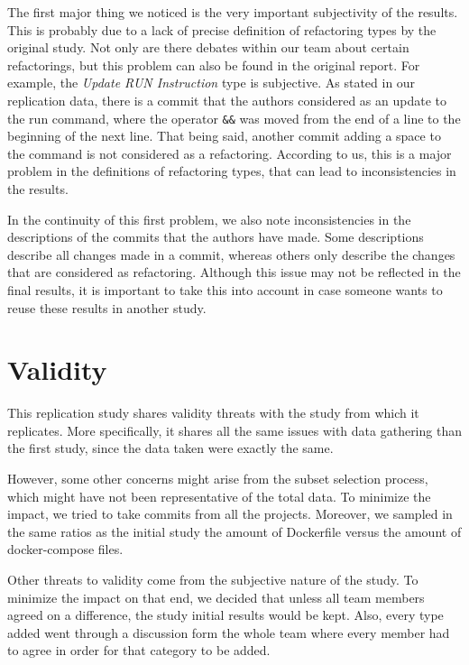 \documentclass[lettersize,journal]{IEEEtran}
\begin{document}
The first major thing we noticed is the very important subjectivity of the results.
This is probably due to a lack of precise definition of refactoring types by the original study.
Not only are there debates within our team about certain refactorings, but this problem can also be found in the original report.
For example, the \textit{Update RUN Instruction} type is subjective.
As stated in our replication data, there is a commit that the authors considered as an update to the run command, where the operator \texttt{\&\&} was moved from the end of a line to the beginning of the next line.
That being said, another commit adding a space to the command is not considered as a refactoring.
According to us, this is a major problem in the definitions of refactoring types, that can lead to inconsistencies in the results.

In the continuity of this first problem, we also note inconsistencies in the descriptions of the commits that the authors have made.
Some descriptions describe all changes made in a commit, whereas others only describe the changes that are considered as refactoring.
Although this issue may not be reflected in the final results, it is important to take this into account in case someone wants to reuse these results in another study.


\section{Validity}

This replication study shares validity threats with the study from \cite{1} which it replicates.
More specifically, it shares all the same issues with data gathering than the first study, since the data taken were exactly the same.

However, some other concerns might arise from the subset selection process, which might have not been representative of the total data.
To minimize the impact, we tried to take commits from all the projects.
Moreover, we sampled in the same ratios as the initial study the amount of Dockerfile versus the amount of docker-compose files.

Other threats to validity come from the subjective nature of the study.
To minimize the impact on that end, we decided that unless all team members agreed on a difference, the study initial results would be kept.
Also, every type added went through a discussion form the whole team where every member had to agree in order for that category to be added.
\end{document}
